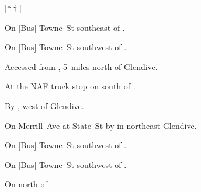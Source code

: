 
[$\ast\dagger$]

\begin{LocationList}

On [Bus] Towne~St southeast of .

On [Bus] Towne~St southwest of .

Accessed from , 5~miles north of Glendive.

At the NAF truck stop on  south of  .

By ,
west of Glendive.

On Merrill~Ave at State~St by   in northeast Glendive.

On [Bus] Towne~St southwest of .

On [Bus] Towne~St southwest of .

\Location{\TruckStop \Gas \Rest \Weigh}
On  north of  .

\end{LocationList}
